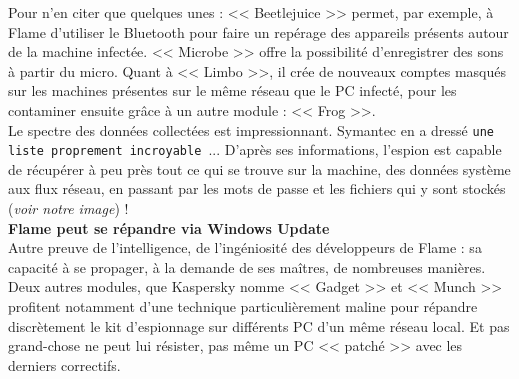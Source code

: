 \documentclass[11pt,twoside,a4paper]{article}
\begin{document}
\begin{minipage}[ht]{12.50cm}
	Pour n'en citer que quelques unes : << Beetlejuice >> permet, par exemple, {\`a} Flame d'utiliser le Bluetooth pour faire un rep{\'e}rage des appareils pr{\'e}sents autour de la machine infect{\'e}e. << Microbe >> offre la possibilit{\'e} d'enregistrer des sons {\`a} partir du micro. Quant {\`a} << Limbo >>, il cr{\'e}e de nouveaux comptes masqu{\'e}s sur les machines pr{\'e}sentes sur le m{\^e}me r{\'e}seau que le PC infect{\'e}, pour les contaminer ensuite gr{\^a}ce {\`a} un autre module : << Frog >>.~\\
	
	Le spectre des donn{\'e}es collect{\'e}es est impressionnant. Symantec en a dress{\'e} \texttt{une liste proprement incroyable~\footnotemark}... D'apr{\`e}s ses informations, l'espion est capable de r{\'e}cup{\'e}rer {\`a} peu pr{\`e}s tout ce qui se trouve sur la machine, des donn{\'e}es syst{\`e}me aux flux r{\'e}seau, en passant par les mots de passe et les fichiers qui y sont stock{\'e}s (\emph{voir notre image}) !~\\
	
	\textbf{\large Flame peut se r{\'e}pandre via Windows Update}~\\

	Autre preuve de l'intelligence, de l'ing{\'e}niosit{\'e} des d{\'e}veloppeurs de Flame : sa capacit{\'e} {\`a} se propager, {\`a} la demande de ses ma{\^i}tres, de nombreuses mani{\`e}res. Deux autres modules, que Kaspersky nomme << Gadget >> et << Munch >> profitent notamment d'une technique particuli{\`e}rement maline pour r{\'e}pandre discr{\`e}tement le kit d'espionnage sur diff{\'e}rents PC d'un m{\^e}me r{\'e}seau local. Et pas grand-chose ne peut lui r{\'e}sister, pas m{\^e}me un PC << patch{\'e} >> avec les derniers correctifs.~\\
	

\end{minipage}
\end{document}
